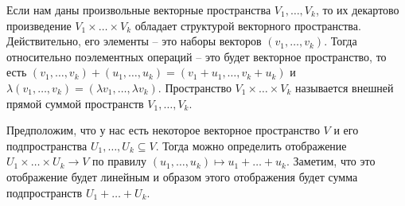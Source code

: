 \begin{definition}
Если нам даны произвольные векторные пространства $V_1,\ldots, V_k$, то их декартово произведение $V_1\times\ldots\times V_k$ обладает структурой векторного пространства.
Действительно, его элементы -- это наборы векторов $(v_1,\ldots,v_k)$.
Тогда относительно поэлементных операций -- это будет векторное пространство, то есть
$(v_1,\ldots,v_k) + (u_1,\ldots,u_k) = (v_1 + u_1,\ldots,v_k + u_k)$ и $\lambda(v_1,\ldots,v_k) = (\lambda v_1, \ldots, \lambda v_k)$.
Пространство $V_1\times\ldots \times V_k$ называется внешней прямой суммой пространств $V_1,\ldots, V_k$.
\end{definition}

Предположим, что у нас есть некоторое векторное пространство $V$ и его подпространства $U_1,\ldots,U_k\subseteq V$.
Тогда можно определить отображение $U_1\times \ldots \times U_k \to V$ по правилу $(u_1,\ldots,u_k) \mapsto u_1 + \ldots + u_k$.
Заметим, что это отображение будет линейным и образом этого отображения будет сумма подпространств $U_1 + \ldots + U_k$.

